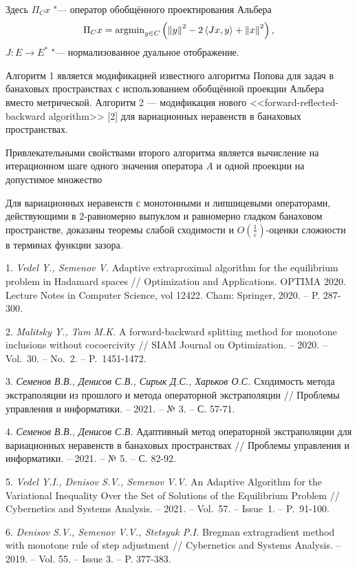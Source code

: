 Здесь $\Pi_{C} x$ "--- оператор обобщённого проектирования Альбера
$$
\Pi_{C} x = {\rm argmin}_{y \in C} \left(  \left\| y\right\| ^{2} -2\left\langle Jx, y\right\rangle +\left\| x\right\| ^{2} \right),
$$
$J: E \to E^\ast$ "--- нормализованное дуальное отображение.

Алгоритм 1 является модификацией известного алгоритма Попова для задач в банаховых пространствах с использованием обобщённой проекции Альбера вместо метрической. Алгоритм 2 --- модификация нового \foreignlanguage{english}{<<forward-reflected-backward algorithm>>} [2] для вариационных неравенств в банаховых пространствах.

Привлекательными свойствами  второго алгоритма является вычисление на итерационном шаге одного значения оператора $A$ и одной проекции на допустимое множество

Для вариационных неравенств с монотонными и ли\-пши\-цевыми операторами, действующими в  $2$-равномерно выпуклом и равномерно гладком банаховом пространстве, доказаны теоремы слабой сходимости и $O(\frac{1}{\varepsilon})$-оценки сложности в терминах функции зазора.

\litlist

1. {\it Vedel Y., Semenov V.} Adaptive extraproximal algorithm for the equilibrium problem in Hadamard spaces // Optimi\-za\-tion and Applications. OPTIMA 2020. Lecture Notes in Compu\-ter Science, vol 12422. Cham: Springer, 2020. -- P. 287-300.

2. {\it Malitsky Y., Tam M.K.} A forward-backward spli\-tting method for monotone inclusions without cocoercivity // SIAM Journal on Optimization. -- 2020. -- Vol.~30. -- No.~2. -- P.~1451-1472.

3. {\it Семенов В.В.,  Денисов С.В.,  Сирык Д.С.,  Харьков О.С.} Сходимость метода экстраполяции из прошлого и метода операторной экстраполяции // Проблемы управления и информатики. -- 2021. -- № 3. -- С. 57-71.

4. {\it Семенов В.В.,  Денисов С.В.} Адаптивный метод операторной экстраполяции для вариационных неравенств в банаховых пространствах // Проблемы управления и информатики. -- 2021. -- № 5. -- С. 82-92.


5. {\it Vedel  Y.I., Denisov  S.V., Semenov V.V.} An Adaptive Algorithm for the Variational Inequality Over the Set of So\-lu\-tions of the Equilibrium Problem // Cybernetics and Systems Analysis. -- 2021. -- Vol.~57. -- Issue~1. -- P.~91-100.

6. {\it	Denisov S.V., Semenov V.V., Stetsyuk P.I.} Bregman ex\-tra\-gradient me\-thod with monotone rule of step adjustment // Cybernetics and Systems Analysis.  -- 2019. -- Vol. 55. -- Issue 3. -- P. 377-383.
